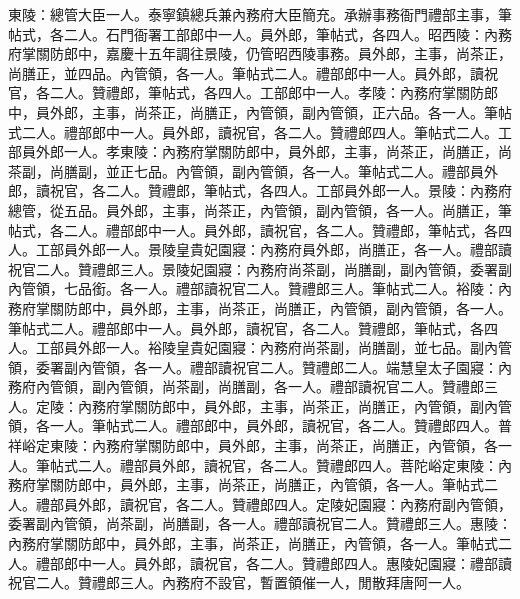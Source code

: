 \begin{pinyinscope}
東陵：總管大臣一人。泰寧鎮總兵兼內務府大臣簡充。承辦事務衙門禮部主事，筆帖式，各二人。石門衙署工部郎中一人。員外郎，筆帖式，各四人。昭西陵：內務府掌關防郎中，嘉慶十五年調往景陵，仍管昭西陵事務。員外郎，主事，尚茶正，尚膳正，並四品。內管領，各一人。筆帖式二人。禮部郎中一人。員外郎，讀祝官，各二人。贊禮郎，筆帖式，各四人。工部郎中一人。孝陵：內務府掌關防郎中，員外郎，主事，尚茶正，尚膳正，內管領，副內管領，正六品。各一人。筆帖式二人。禮部郎中一人。員外郎，讀祝官，各二人。贊禮郎四人。筆帖式二人。工部員外郎一人。孝東陵：內務府掌關防郎中，員外郎，主事，尚茶正，尚膳正，尚茶副，尚膳副，並正七品。內管領，副內管領，各一人。筆帖式二人。禮部員外郎，讀祝官，各二人。贊禮郎，筆帖式，各四人。工部員外郎一人。景陵：內務府總管，從五品。員外郎，主事，尚茶正，內管領，副內管領，各一人。尚膳正，筆帖式，各二人。禮部郎中一人。員外郎，讀祝官，各二人。贊禮郎，筆帖式，各四人。工部員外郎一人。景陵皇貴妃園寢：內務府員外郎，尚膳正，各一人。禮部讀祝官二人。贊禮郎三人。景陵妃園寢：內務府尚茶副，尚膳副，副內管領，委署副內管領，七品銜。各一人。禮部讀祝官二人。贊禮郎三人。筆帖式二人。裕陵：內務府掌關防郎中，員外郎，主事，尚茶正，尚膳正，內管領，副內管領，各一人。筆帖式二人。禮部郎中一人。員外郎，讀祝官，各二人。贊禮郎，筆帖式，各四人。工部員外郎一人。裕陵皇貴妃園寢：內務府尚茶副，尚膳副，並七品。副內管領，委署副內管領，各一人。禮部讀祝官二人。贊禮郎二人。端慧皇太子園寢：內務府內管領，副內管領，尚茶副，尚膳副，各一人。禮部讀祝官二人。贊禮郎三人。定陵：內務府掌關防郎中，員外郎，主事，尚茶正，尚膳正，內管領，副內管領，各一人。筆帖式二人。禮部郎中，員外郎，讀祝官，各二人。贊禮郎四人。普祥峪定東陵：內務府掌關防郎中，員外郎，主事，尚茶正，尚膳正，內管領，各一人。筆帖式二人。禮部員外郎，讀祝官，各二人。贊禮郎四人。菩陀峪定東陵：內務府掌關防郎中，員外郎，主事，尚茶正，尚膳正，內管領，各一人。筆帖式二人。禮部員外郎，讀祝官，各二人。贊禮郎四人。定陵妃園寢：內務府副內管領，委署副內管領，尚茶副，尚膳副，各一人。禮部讀祝官二人。贊禮郎三人。惠陵：內務府掌關防郎中，員外郎，主事，尚茶正，尚膳正，內管領，各一人。筆帖式二人。禮部郎中一人。員外郎，讀祝官，各二人。贊禮郎四人。惠陵妃園寢：禮部讀祝官二人。贊禮郎三人。內務府不設官，暫置領催一人，閒散拜唐阿一人。


\end{pinyinscope}
